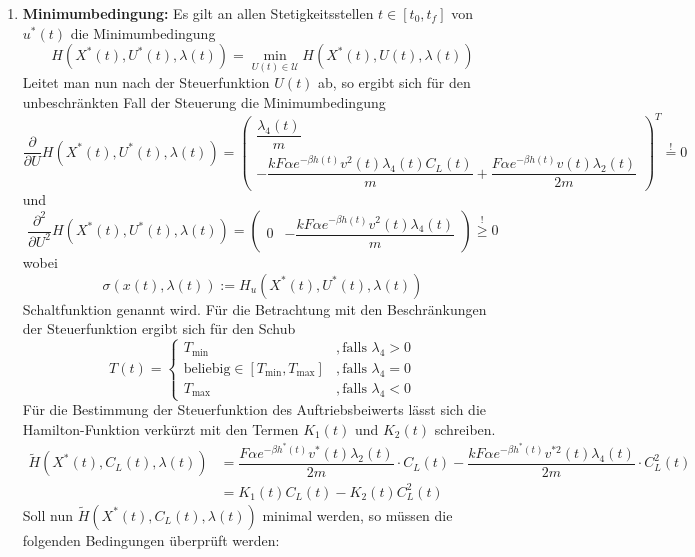 \begin{enumerate}
    \item \textbf{Minimumbedingung:} Es gilt an allen Stetigkeitsstellen $t \in [t_0,t_f]$ von $u^{\ast}(t)$ die Minimumbedingung \[H(X^{\ast}(t),U^{\ast}(t),\lambda(t)) = \min_{U(t) \in \mathcal{U}} H(X^{\ast}(t),U(t),\lambda(t))\] Leitet man nun nach der Steuerfunktion $U(t)$ ab, so ergibt sich für den unbeschränkten Fall der Steuerung die Minimumbedingung
    \[\dfrac{\partial}{\partial U} H(X^{\ast}(t),U^{\ast}(t),\lambda(t)) = \begin{pmatrix}
    \dfrac{\lambda_4(t)}{m} \\ 
    - \dfrac{k F \alpha e^{-\beta h(t)} v^2(t) \lambda_4(t) C_L(t)}{m} + \dfrac{F \alpha e^{-\beta h(t)} v(t) \lambda_2(t)}{2m}
    \end{pmatrix}^T \stackrel{!}{=} 0\]
    und 
    \[\dfrac{\partial^2}{\partial U^2} H(X^{\ast}(t),U^{\ast}(t),\lambda(t)) = \begin{pmatrix}
    0 & - \dfrac{k F \alpha e^{-\beta h(t)} v^2(t) \lambda_4(t)}{m} 
    \end{pmatrix} \stackrel{!}{\geq} 0\] wobei \[\sigma(x(t),\lambda(t)) := H_u(X^{\ast}(t),U^{\ast}(t),\lambda(t))\] Schaltfunktion genannt wird. Für die Betrachtung mit den Beschränkungen der Steuerfunktion ergibt sich für den Schub
\begin{equation}\label{func:SynSchub}
T(t) = \left\lbrace \begin{array}{ll}
T_{\min} & ,\text{falls } \lambda_4 > 0  \\ 
\text{beliebig} \in [T_{\min},T_{\max}] & ,\text{falls } \lambda_4 = 0  \\ 
T_{\max} & ,\text{falls } \lambda_4 < 0
\end{array} \right.
\end{equation}
Für die Bestimmung der Steuerfunktion des Auftriebsbeiwerts lässt sich die Hamilton-Funktion verkürzt mit den Termen $K_1(t)$ und $K_2(t)$ schreiben.
    \[\begin{split}
        \tilde{H}(X^{\ast}(t),C_L(t),\lambda(t)) &= \dfrac{F \alpha e^{-\beta h^{\ast}(t)} v^{\ast}(t) \lambda_2(t)}{2m} \cdot C_L(t) - \dfrac{k F \alpha e^{-\beta h^{\ast}(t)}  v^{\ast 2}(t) \lambda_4(t)}{2m} \cdot C_L^2(t) \\\
        &= K_1(t) C_L(t) - K_2(t) C_L^2(t)
    \end{split}\]
Soll nun $\tilde{H}(X^{\ast}(t),C_L(t),\lambda(t))$ minimal werden, so müssen die folgenden Bedingungen überprüft werden:
    \begin{enumerate}

\end{enumerate}
\end{enumerate}
